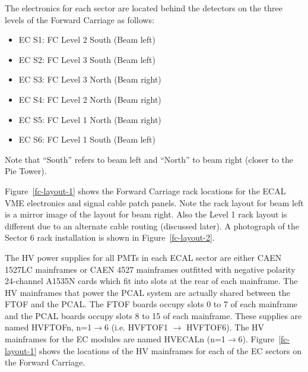 \documentclass[letterpaper,10pt]{article}
\begin{document}
The electronics for each sector are located behind the detectors on the three levels of the Forward 
Carriage as follows:

\vskip 0.5cm

\begin{minipage}{0.5\textwidth}
\begin{itemize}
\item EC S1: FC Level 2 South (Beam left)
\item EC S2: FC Level 3 South (Beam left)
\item EC S3: FC Level 3 North (Beam right)
\end{itemize}
\end{minipage}
\begin{minipage}{0.5\textwidth}
\begin{itemize}
\item EC S4: FC Level 2 North (Beam right)
\item EC S5: FC Level 1 North (Beam right)
\item EC S6: FC Level 1 South (Beam left)
\end{itemize}
\end{minipage}

\vskip 0.5cm

Note that ``South'' refers to beam left and ``North'' to beam right (closer to the Pie Tower).

Figure~\ref{fc-layout-1} shows the Forward Carriage rack locations for the ECAL VME electronics and signal cable patch 
panels.  Note the rack layout for beam left is a mirror image of the layout for beam right.  Also the Level 1 rack layout
is different due to an alternate cable routing (discussed later).  A photograph of the Sector 6 rack installation is
shown in Figure~\ref{fc-layout-2}.

The HV power supplies for all PMTs in each ECAL sector are either CAEN 1527LC mainframes or CAEN 4527 mainframes 
outfitted with negative polarity 24-channel A1535N cards which fit into slots at the rear of each
mainframe. The HV mainframes that power the PCAL 
system are actually shared between the FTOF and the PCAL. The FTOF boards occupy slots 0 to 7 of each 
mainframe and the PCAL boards occupy slots 8 to 15 of each mainframe. These supplies are named HVFTOFn, 
n=1$\to$6 (i.e. HVFTOF1 $\to$ HVFTOF6). The HV mainframes for the EC modules are named HVECALn (n=1$\to$6).
Figure~\ref{fc-layout-1} shows the locations of the HV mainframes for each of the EC sectors on the Forward Carriage.
\end{document}
